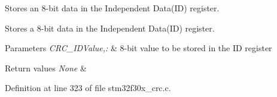 Stores an 8-\/bit data in the Independent Data(\-I\-D) register. 

Stores a 8-\/bit data in the Independent Data(\-I\-D) register.


\begin{DoxyParams}{Parameters}
{\em C\-R\-C\-\_\-\-I\-D\-Value,\-:} & 8-\/bit value to be stored in the I\-D register \\
\hline
\end{DoxyParams}

\begin{DoxyRetVals}{Return values}
{\em None} & \\
\hline
\end{DoxyRetVals}


Definition at line 323 of file stm32f30x\-\_\-crc.\-c.

